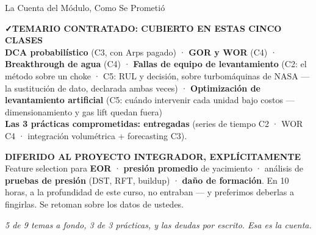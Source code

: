 \documentclass[aspectratio=169, 11pt]{beamer}
\begin{document}
\begin{frame}[shrink=24]{La Cuenta del Módulo, Como Se Prometió}
  \vspace{-2pt}
  \begin{tcolorbox}[colback=arcaGray, colframe=codeGreen, boxrule=0pt, leftrule=3pt,
    arc=3pt, left=8pt, right=8pt, top=5pt, bottom=5pt]
    {\scriptsize\color{codeGreen}\bfseries\faCheck\hspace{4pt}TEMARIO CONTRATADO: CUBIERTO EN ESTAS CINCO CLASES}\\[4pt]
    {\scriptsize\color{textMuted}
     \textbf{DCA probabilístico} (C3, con Arps pagado) ·
     \textbf{GOR y WOR} (C4) · \textbf{Breakthrough de agua} (C4) ·
     \textbf{Fallas de equipo de levantamiento} (C2: el método sobre un
     choke · C5: RUL y decisión, sobre turbomáquinas de NASA --- la
     sustitución de dato, declarada ambas veces) ·
     \textbf{Optimización de levantamiento artificial} (C5: cuándo
     intervenir cada unidad bajo costos --- dimensionamiento y gas lift
     quedan fuera) \\[3pt]
     \textbf{Las 3 prácticas comprometidas: entregadas} (series de
     tiempo C2 · WOR C4 · integración volumétrica + forecasting C3).}
  \end{tcolorbox}
  \vspace{6pt}
  \begin{tcolorbox}[colback=arcaGray, colframe=arcaRed, boxrule=0pt, leftrule=3pt,
    arc=3pt, left=8pt, right=8pt, top=5pt, bottom=5pt]
    {\scriptsize\color{arcaRed}\bfseries\faArrowCircleRight\hspace{4pt}DIFERIDO AL PROYECTO INTEGRADOR, EXPLÍCITAMENTE}\\[4pt]
    {\scriptsize\color{textMuted}
     Feature selection para \textbf{EOR} · \textbf{presión promedio} de
     yacimiento · análisis de \textbf{pruebas de presión} (DST, RFT,
     buildup) · \textbf{daño de formación}. En 10 horas, a la
     profundidad de este curso, no entraban --- y preferimos deberlas a
     fingirlas. Se retoman sobre los datos de ustedes.}
  \end{tcolorbox}
  \vspace{5pt}
  {\scriptsize\color{arcaDark}\itshape
   5 de 9 temas a fondo, 3 de 3 prácticas, y las deudas por escrito.
   Esa es la cuenta.}
\end{frame}
\end{document}
